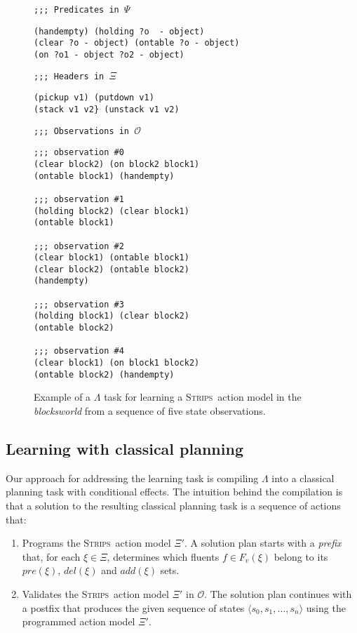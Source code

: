 \documentclass{article}
\newcommand{\tup}[1]{{\langle #1 \rangle}}
\newcommand{\strips}{\textsc{Strips}}     %
\begin{document}
\begin{figure}[hbt!]
{\footnotesize\tt ;;; Predicates in $\Psi$}
\begin{footnotesize}
\begin{verbatim}
(handempty) (holding ?o  - object)
(clear ?o - object) (ontable ?o - object)
(on ?o1 - object ?o2 - object)
\end{verbatim}
\end{footnotesize}
\vspace{0.2cm}
{\footnotesize\tt ;;; Headers in $\Xi$}
\begin{footnotesize}
\begin{verbatim}
(pickup v1) (putdown v1)
(stack v1 v2} (unstack v1 v2)
\end{verbatim}
\end{footnotesize}
\vspace{0.2cm}
{\footnotesize\tt ;;; Observations in $\mathcal{O}$}
\begin{footnotesize}
\begin{verbatim}
;;; observation #0
(clear block2) (on block2 block1)
(ontable block1) (handempty)

;;; observation #1
(holding block2) (clear block1)
(ontable block1)

;;; observation #2
(clear block1) (ontable block1)
(clear block2) (ontable block2)
(handempty)

;;; observation #3
(holding block1) (clear block2)
(ontable block2)

;;; observation #4
(clear block1) (on block1 block2)
(ontable block2) (handempty)
\end{verbatim}
\end{footnotesize}
 \caption{\small Example of a $\Lambda$ task for learning a \strips\ action model in the {\em blocksworld} from a sequence of five state observations.}
\label{fig:lexample}
\end{figure}


\subsection{Learning with classical planning}

Our approach for addressing the learning task is compiling $\Lambda$ into a classical planning task with conditional effects. The intuition behind the compilation is that a solution to the resulting classical planning task is a sequence of actions that:

\begin{enumerate}
\item Programs the \strips\ action model $\Xi'$. A solution plan starts with a {\em prefix} that, for each $\xi\in\Xi$, determines which fluents $f\in F_v(\xi)$ belong to its $pre(\xi)$, $del(\xi)$ and $add(\xi)$ sets.
\item Validates the \strips\ action model $\Xi'$ in $\mathcal{O}$. The solution plan continues with a postfix that produces the given sequence of states $\tup{s_0,s_1,\ldots,s_{n}}$ using the programmed action model $\Xi'$.
\end{enumerate}
\end{document}
